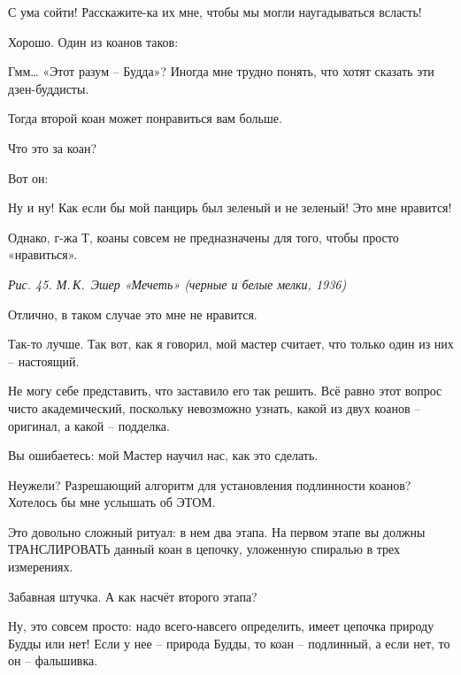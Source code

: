 \documentclass[../main.tex]{subfiles}
\begin{document}
\begin{dialogue}
 С ума сойти! Расскажите-ка их мне, чтобы мы могли наугадываться всласть!

 Хорошо. Один из коанов таков:


 Гмм\ldots{} «Этот разум \--- Будда»? Иногда мне трудно понять, что хотят сказать эти дзен-буддисты.

 Тогда второй коан может понравиться вам больше.

 Что это за коан?

 Вот он:


 Ну и ну! Как если бы мой панцирь был зеленый и не зеленый! Это мне нравится!

 Однако, г-жа Т, коаны совсем не предназначены для того, чтобы просто «нравиться».

\emph{Рис. 45. М.\,К.~Эшер «Мечеть» (черные и белые мелки, 1936)}

 Отлично, в таком случае это мне не нравится.

 Так-то лучше. Так вот, как я говорил, мой мастер считает, что только один из них \--- настоящий.

 Не могу себе представить, что заставило его так решить. Всё равно этот вопрос чисто академический, поскольку невозможно узнать, какой из двух коанов \--- оригинал, а какой \--- подделка.

 Вы ошибаетесь: мой Мастер научил нас, как это сделать.

 Неужели? Разрешающий алгоритм для установления подлинности коанов? Хотелось бы мне услышать об ЭТОМ.

 Это довольно сложный ритуал: в нем два этапа. На первом этапе вы должны ТРАНСЛИРОВАТЬ данный коан в цепочку, уложенную спиралью в трех измерениях.

 Забавная штучка. А как насчёт второго этапа?

 Ну, это совсем просто: надо всего-навсего определить, имеет цепочка природу Будды или нет! Если у нее \--- природа Будды, то коан \--- подлинный, а если нет, то он \--- фальшивка.


\end{dialogue}
\end{document}
